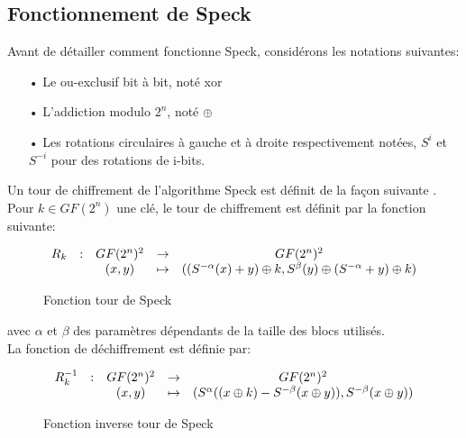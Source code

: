 	\subsection{Fonctionnement de Speck}

		Avant de détailler comment fonctionne Speck, considérons les notations suivantes:

		\begin{enumerate}
		  \item[•] Le ou-exclusif bit à bit, noté xor
		  \item[•] L'addiction modulo $2^n$, noté $\mathbin{\oplus}$
		  \item[•] Les rotations circulaires à gauche et à droite respectivement notées,
		    $S^i$ et $S^{-i}$ pour des rotations de i-bits.
		\end{enumerate}

		Un tour de chiffrement de l'algorithme Speck est définit de la façon suivante \cite{speck_families}. \\
		Pour $k \in GF(2^n)$ une clé, le tour de chiffrement est définit par la fonction suivante:

		\begin{figure}[H]
			\centering
			\[
			\begin{array}{ccccc}
			R_k & : & GF(2^n)^2 & \to & GF(2^n)^2 \\
			 & & (x,y) & \mapsto & ((S^{-\alpha}(x) + y) \mathbin{\oplus} k, S^\beta (y) \mathbin{\oplus} (S^{-\alpha} + y) \mathbin{\oplus} k) \\
			\end{array}
			\]
			\caption{Fonction tour de Speck}
			\label{tourSpeck}
		\end{figure}



		avec $\alpha$ et $\beta$ des paramètres dépendants de la taille des blocs utilisés. \\

		La fonction de déchiffrement est définie par:

		\begin{figure}[H]
			\centering
			\[
			\begin{array}{ccccc}
			R_k^{-1} & : & GF(2^n)^2 & \to & GF(2^n)^2 \\
			 & & (x,y) & \mapsto & (S^\alpha ((x \mathbin{\oplus} k) - S^{-\beta}(x \mathbin{\oplus} y)), S^{-\beta}(x \mathbin{\oplus} y)) \\
			\end{array}
			\]
			\caption{Fonction inverse tour de Speck}
			\label{tourSpeck}
		\end{figure}


